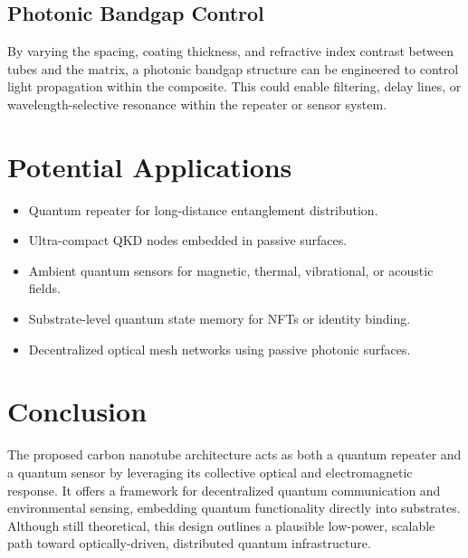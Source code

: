 \documentclass[11pt]{article}
\begin{document}
	\subsection{Photonic Bandgap Control}
	By varying the spacing, coating thickness, and refractive index contrast between tubes and the matrix, a photonic bandgap structure can be engineered to control light propagation within the composite. This could enable filtering, delay lines, or wavelength-selective resonance within the repeater or sensor system.
	
	\section{Potential Applications}
	\begin{itemize}
		\item Quantum repeater for long-distance entanglement distribution.
		\item Ultra-compact QKD nodes embedded in passive surfaces.
		\item Ambient quantum sensors for magnetic, thermal, vibrational, or acoustic fields.
		\item Substrate-level quantum state memory for NFTs or identity binding.
		\item Decentralized optical mesh networks using passive photonic surfaces.
	\end{itemize}
	
	\section{Conclusion}
	The proposed carbon nanotube architecture acts as both a quantum repeater and a quantum sensor by leveraging its collective optical and electromagnetic response. It offers a framework for decentralized quantum communication and environmental sensing, embedding quantum functionality directly into substrates. Although still theoretical, this design outlines a plausible low-power, scalable path toward optically-driven, distributed quantum infrastructure.
	
\end{document}
